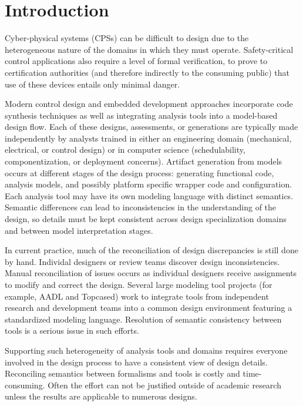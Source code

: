 \section{Introduction}

Cyber-physical systems (CPSs) can be difficult to design due to the heterogeneous 
nature of the domains in which they must operate.  Safety-critical control applications also 
require a level of formal verification, to prove to certification authorities (and 
therefore indirectly to the consuming public) that use of these devices entails only 
minimal danger.  

Modern control design and embedded development approaches incorporate code
synthesis techniques as well as integrating analysis tools into a model-based 
design flow. Each of these designs, assessments, or generations are
typically made independently by analysts trained in either an engineering domain
(mechanical, electrical, or control design) or in computer science
(schedulability, componentization, or deployment concerns).
Artifact generation from models occurs at different stages of the design
process: generating functional code, analysis models, and possibly platform
specific wrapper code and configuration.  Each analysis tool may
have its own modeling language with distinct semantics. Semantic differences can
lead to inconsistencies in the understanding of the design, so details must be
kept consistent across design specialization domains and between model
interpretation stages.

In current practice, much of the reconciliation of design discrepancies is still
done by hand.  Individal designers or review teams discover design
inconsistencies.  Manual reconciliation of issues occurs as individual
designers receive assignments to modify and correct the design.  Several large
modeling tool projects (for example, AADL \cite{modeling:aadl_control_systems}
and Topcased\cite{tools:Topcased}) work to integrate tools from
independent research and development teams into a common design environment
featuring a standardized modeling language.  Resolution of semantic consistency
between tools is a serious issue in such efforts.

Supporting such heterogeneity of analysis tools and domains requires everyone involved in 
the design process to have a consistent view of design details.  Reconciling semantics 
between formalisms and tools is costly and time-consuming.  Often the effort can not be 
justified outside of academic research unless the results are applicable to numerous designs.

